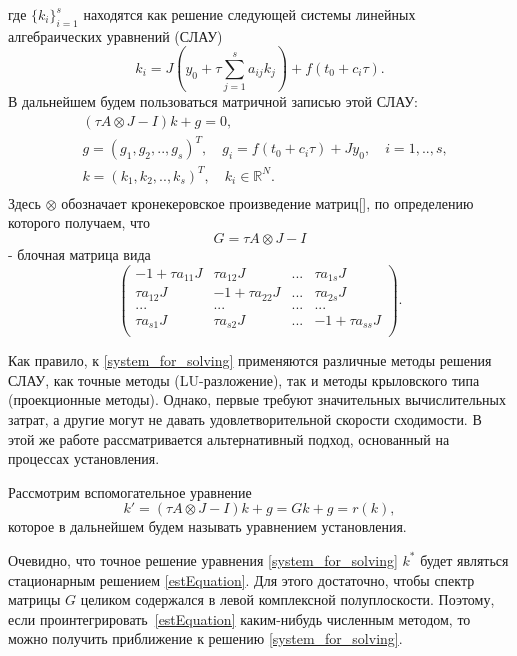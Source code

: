 \documentclass[a4paper,14pt]{extreport}
\begin{document}
где $\{k_i\}_{i=1}^s$ находятся как решение следующей системы линейных алгебраических уравнений (СЛАУ)
	$$k_i = J(y_0+\tau\sum_{j=1}^sa_{ij}k_j)+f(t_0+c_i\tau).$$
В дальнейшем будем пользоваться матричной записью этой СЛАУ:
	\begin{equation}\label{system_for_solving}
	\begin{aligned}
	&(\tau A\otimes J-I)k+g=0,\\
	&g=(g_1,g_2,..,g_s)^T, \quad g_i=f(t_0+c_i \tau)+Jy_0, \quad i=1,..,s,\\
	&k=(k_1,k_2,..,k_s)^T, \quad k_i \in \mathbb{R}^N.\\
	\end{aligned}
	\end{equation}
Здесь $\otimes$ обозначает кронекеровское произведение матриц[], по
определению которого получаем, что $$G=\tau A\otimes J-I$$ - блочная
матрица вида
	\begin{equation}
	\left(
	\begin{array}{llll}
	-1+\tau a_{11}J& \tau a_{12}J&...&\tau a_{1s}J\\
 	\tau a_{12}J&-1+\tau a_{22}J&...&\tau a_{2s}J\\
	...&...&...&...\\
	\tau a_{s1}J& \tau a_{s2}J&...&-1+\tau a_{ss}J\\
	\end{array}
	\right ).
	\end{equation}
	
Как правило, к \eqref{system_for_solving} применяются различные методы решения СЛАУ, как точные методы (LU-разложение), так и методы крыловского типа (проекционные методы). Однако, первые требуют значительных вычислительных затрат, а другие могут не давать удовлетворительной скорости сходимости. В этой же работе рассматривается альтернативный подход, основанный на процессах установления\cite{Bondar_Faleichik_Parall}.
	
 
Рассмотрим вспомогательное уравнение
	\begin{equation}
	\label{estEquation}
	k'=(\tau A\otimes J-I)k+g=Gk+g = r(k),
	\end{equation}
которое в дальнейшем будем называть уравнением установления.

Очевидно, что точное решение уравнения \eqref{system_for_solving} $k^*$ будет являться стационарным решением \eqref{estEquation}. Для этого достаточно, чтобы спектр матрицы $G$ целиком содержался в левой комплексной полуплоскости. Поэтому, если проинтегрировать~\eqref{estEquation}  каким-нибудь численным методом, то можно получить приближение к решению \eqref{system_for_solving}.
\end{document}
